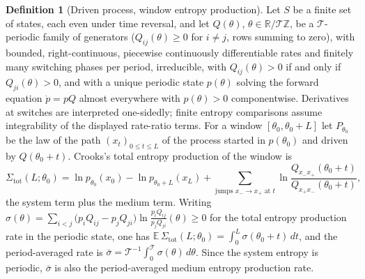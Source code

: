 \documentclass[10pt]{article}
\theoremstyle{definition}
\newtheorem{definition}[theorem]{Definition}
\newcommand{\per}{\mathcal T}
\newcommand{\sbar}{\bar\sigma}
\newcommand{\E}{\mathbb E}
\newcommand{\Rr}{\mathbb R}
\newcommand{\Z}{\mathbb Z}
\begin{document}
\begin{definition}[Driven process, window entropy production]
\label{def:process}
Let $S$ be a finite set of states, each even under time reversal, and let
$Q(\theta)$, $\theta\in\Rr/\per\Z$, be a $\per$-periodic family of
generators ($Q_{ij}(\theta)\geq0$ for $i\neq j$, rows summing to zero),
with bounded, right-continuous, piecewise continuously differentiable rates
and finitely many switching phases per period,
irreducible, with $Q_{ij}(\theta)>0$ if and only if $Q_{ji}(\theta)>0$, and
with a unique periodic state $p(\theta)$ solving the forward equation
$\dot p=pQ$ almost everywhere with $p(\theta)>0$ componentwise.
Derivatives at switches are interpreted one-sidedly; finite entropy
comparisons assume integrability of the displayed rate-ratio terms. For a window
$[\theta_0,\theta_0+L]$ let $P_{\theta_0}$ be the law of the path
$(x_t)_{0\leq t\leq L}$ of the process started in $p(\theta_0)$ and driven
by $Q(\theta_0+t)$.  Crooks's total entropy production of the window is
\begin{equation}
\label{eq:sigma-tot}
\Sigma_{\mathrm{tot}}(L;\theta_0)
=\ln p_{\theta_0}(x_0)-\ln p_{\theta_0+L}(x_L)
+\sum_{\text{jumps }x_-\to x_+\text{ at }t}
\ln\frac{Q_{x_-x_+}(\theta_0+t)}{Q_{x_+x_-}(\theta_0+t)},
\end{equation}
the system term plus the medium term.  Writing $\sigma(\theta)=
\sum_{i<j}\bigl(p_iQ_{ij}-p_jQ_{ji}\bigr)\ln\frac{p_iQ_{ij}}{p_jQ_{ji}}(\theta)
\geq0$ for the total entropy production rate in the periodic state, one
has $\E\,\Sigma_{\mathrm{tot}}(L;\theta_0)=\int_0^L\sigma(\theta_0+t)\,dt$,
and the period-averaged rate is $\sbar=\per^{-1}\int_0^\per\sigma(\theta)\,d\theta$.
Since the system entropy is periodic, $\sbar$ is also the period-averaged
medium entropy production rate.
\end{definition}
\end{document}

